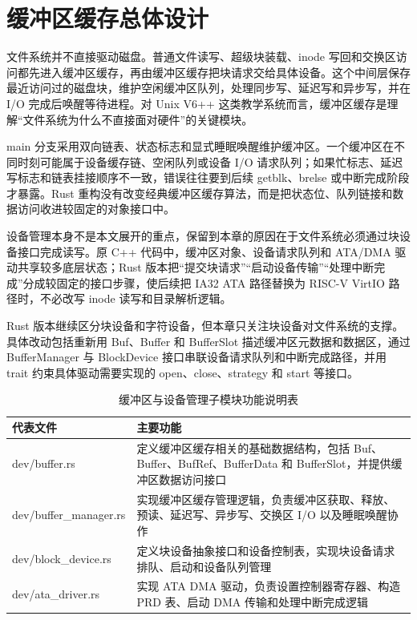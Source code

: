 \section{缓冲区缓存总体设计}

文件系统并不直接驱动磁盘。普通文件读写、超级块装载、inode 写回和交换区访问都先进入缓冲区缓存，再由缓冲区缓存把块请求交给具体设备。这个中间层保存最近访问过的磁盘块，维护空闲缓冲区队列，处理同步写、延迟写和异步写，并在 I/O 完成后唤醒等待进程。对 Unix V6++ 这类教学系统而言，缓冲区缓存是理解“文件系统为什么不直接面对硬件”的关键模块。

main 分支采用双向链表、状态标志和显式睡眠唤醒维护缓冲区。一个缓冲区在不同时刻可能属于设备缓存链、空闲队列或设备 I/O 请求队列；如果忙标志、延迟写标志和链表挂接顺序不一致，错误往往要到后续 getblk、brelse 或中断完成阶段才暴露。Rust 重构没有改变经典缓冲区缓存算法，而是把状态位、队列链接和数据访问收进较固定的对象接口中。

设备管理本身不是本文展开的重点，保留到本章的原因在于文件系统必须通过块设备接口完成读写。原 C++ 代码中，缓冲区对象、设备请求队列和 ATA/DMA 驱动共享较多底层状态；Rust 版本把“提交块请求”“启动设备传输”“处理中断完成”分成较固定的接口步骤，使后续把 IA32 ATA 路径替换为 RISC-V VirtIO 路径时，不必改写 inode 读写和目录解析逻辑。

Rust 版本继续区分块设备和字符设备，但本章只关注块设备对文件系统的支撑。具体改动包括重新用 Buf、Buffer 和 BufferSlot 描述缓冲区元数据和数据区，通过 BufferManager 与 BlockDevice 接口串联设备请求队列和中断完成路径，并用 trait 约束具体驱动需要实现的 open、close、strategy 和 start 等接口。

\begin{table}[htbp]
  \centering
  \caption{缓冲区与设备管理子模块功能说明表}\label{tab:buffer-device-modules}
  \begin{tabular}{p{}p{}}
    \toprule
    \textbf{代表文件} & \textbf{主要功能} \\
    \midrule
    dev/buffer.rs & 定义缓冲区缓存相关的基础数据结构，包括 Buf、Buffer、BufRef、BufferData 和 BufferSlot，并提供缓冲区数据访问接口 \\
    dev/buffer\_manager.rs & 实现缓冲区缓存管理逻辑，负责缓冲区获取、释放、预读、延迟写、异步写、交换区 I/O 以及睡眠唤醒协作 \\
    dev/block\_device.rs & 定义块设备抽象接口和设备控制表，实现块设备请求排队、启动和设备队列管理 \\
    dev/ata\_driver.rs & 实现 ATA DMA 驱动，负责设置控制器寄存器、构造 PRD 表、启动 DMA 传输和处理中断完成逻辑 \\
    \bottomrule
  \end{tabular}
\end{table}

